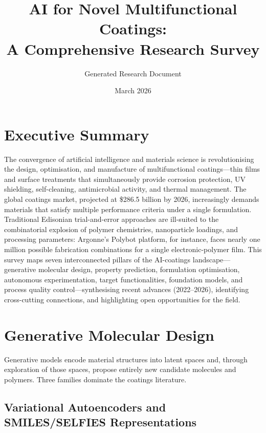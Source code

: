 \documentclass[11pt,a4paper]{article}
\title{\textbf{AI for Novel Multifunctional Coatings:\\A Comprehensive Research Survey}}
\author{Generated Research Document}
\date{March 2026}
\begin{document}
\maketitle
\tableofcontents
\newpage

\section{Executive Summary}

The convergence of artificial intelligence and materials science is revolutionising the design, optimisation, and manufacture of multifunctional coatings---thin films and surface treatments that simultaneously provide corrosion protection, UV shielding, self-cleaning, antimicrobial activity, and thermal management.
The global coatings market, projected at \$286.5 billion by 2026, increasingly demands materials that satisfy multiple performance criteria under a single formulation.
Traditional Edisonian trial-and-error approaches are ill-suited to the combinatorial explosion of polymer chemistries, nanoparticle loadings, and processing parameters: Argonne's Polybot platform, for instance, faces nearly one million possible fabrication combinations for a single electronic-polymer film.
This survey maps seven interconnected pillars of the AI-coatings landscape---generative molecular design, property prediction, formulation optimisation, autonomous experimentation, target functionalities, foundation models, and process quality control---synthesising recent advances (2022--2026), identifying cross-cutting connections, and highlighting open opportunities for the field.

\section{Generative Molecular Design}
\label{sec:generative}

Generative models encode material structures into latent spaces and, through exploration of those spaces, propose entirely new candidate molecules and polymers.
Three families dominate the coatings literature.

\subsection{Variational Autoencoders and SMILES/SELFIES Representations}
\end{document}
